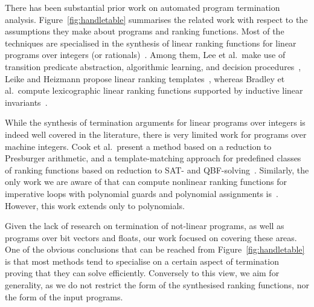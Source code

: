 \documentclass[preprint]{sigplanconf}
\theoremstyle{definition}
\begin{document}
There has been substantial prior work on automated program termination
analysis.  Figure~\ref{fig:handletable} summarises the related work with
respect to the assumptions they make about programs and ranking functions. 
Most of the techniques are specialised in the synthesis of linear ranking
functions for linear programs over integers (or
rationals)~\cite{DBLP:conf/pldi/CookPR06, DBLP:conf/cav/LeeWY12,
DBLP:conf/popl/Ben-AmramG13, DBLP:conf/vmcai/P04,
DBLP:conf/atva/HeizmannHLP13, DBLP:conf/cav/BradleyMS05,
DBLP:conf/tacas/CookSZ13, DBLP:conf/cav/KroeningSTW10}.  Among them, Lee et
al.~make use of transition predicate abstraction, algorithmic learning, and
decision procedures~\cite{DBLP:conf/cav/LeeWY12}, Leike and Heizmann propose
linear ranking templates~\cite{DBLP:conf/tacas/LeikeH14}, whereas Bradley et
al.~compute lexicographic linear ranking functions supported by inductive
linear invariants~\cite{DBLP:conf/cav/BradleyMS05}.

While the synthesis of termination arguments for linear programs over
integers is indeed well covered in the literature, there is very limited
work for programs over machine integers.  Cook et al.~present a method
based on a reduction to Presburger arithmetic, and a template-matching
approach for predefined classes of ranking functions based on reduction to
SAT- and QBF-solving~\cite{DBLP:conf/tacas/CookKRW10}.  Similarly, the only
work we are aware of that can compute nonlinear ranking functions for
imperative loops with polynomial guards and polynomial assignments
is~\cite{DBLP:conf/vmcai/BradleyMS05}.  However, this work extends only to
polynomials.

Given the lack of research on termination of not-linear programs, as well as
programs over bit vectors and floats, our work focused on covering these
areas.  One of the obvious conclusions that can be reached from
Figure~\ref{fig:handletable} is that most methods tend to specialise on a
certain aspect of termination proving that they can solve efficiently. 
Conversely to this view, we aim for generality, as we do not restrict the
form of the synthesised ranking functions, nor the form of the input
programs. 

\end{document}
